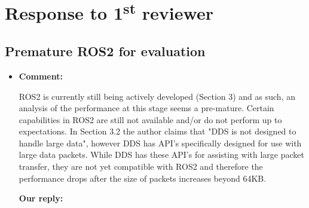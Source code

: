 \documentclass{article}
\newcommand\st{\textsuperscript{st}\xspace}
\begin{document}








\section{Response to 1\st reviewer}

\subsection{Premature ROS2 for evaluation}
\begin{itemize}

\item \begin{flushleft}
    \textbf{Comment:}
  \end{flushleft}
  ROS2 is currently still being actively developed (Section 3) and as such, an analysis of the performance at this stage seems a pre-mature. Certain capabilities in ROS2 are still not available and/or do not perform up to expectations. In Section 3.2 the author claims that "DDS is not designed to handle large data", however DDS has API's specifically designed for use with large data packets. While DDS has these API’s for assisting with large packet transfer, they are not yet compatible with ROS2 and therefore the performance drops after the size of packets increases beyond 64KB.

  \begin{flushleft}
    \textbf{Our reply:}
  \end{flushleft}

\end{itemize}
\end{document}
